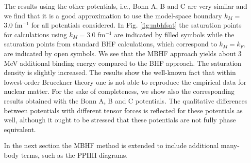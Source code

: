 The results using the other potentials, i.e., Bonn A, B and 
C are very similar and we 
find that 
it is a good approximation to use the model-space boundary 
$k_M=$3.0 fm$^{-1}$ for all potentials considered.
In Fig. \ref{fig:mbhfsat} the saturation points for calculations using
$k_M=$3.0 fm$^{-1}$ are indicated  by filled symbols while the 
saturation points from standard BHF calculations, 
which correspond to $k_M=k_F$, are indicated by open symbols. 
We see that the MBHF approach yields about 3 MeV 
additional binding energy compared to the BHF approach. 
The saturation density is slightly increased. 
The results show the well-known fact that within lowest-order 
Brueckner theory one is not able to reproduce 
the empirical data for nuclear matter. 
For the sake of completeness, we show also the corresponding results
obtained with the Bonn A, B and C potentials. The qualitative differences
between potentials with different tensor forces
 is reflected for these  potentials as well, although it ought to be stressed
that these potentials are not fully phase equivalent.
 
In the next section the 
MBHF method is extended to include additional many-body terms, such
as the PPHH diagrams.

